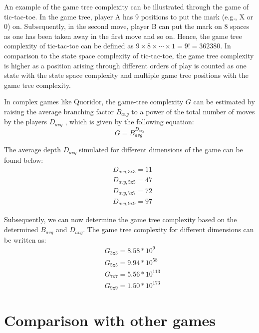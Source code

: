An example of the game tree complexity can be illustrated through the game of tic-tac-toe. In the game tree, player A has 9 positions to put the mark (e.g., X or 0) on. Subsequently, in the second move, player B can put the mark on 8 spaces as one has been taken away in the first move and so on. Hence, the game tree complexity of tic-tac-toe can be defined as $9 \times 8 \times \cdots \times 1 = 9! = 362380$. In comparison to the state space complexity of tic-tac-toe, the game tree complexity is higher as a position arising through different orders of play is counted as one state with the state space complexity and multiple game tree positions with the game tree complexity. 


In complex games like Quoridor, the game-tree complexity $G$ can be estimated by raising the average branching factor $B_{avg}$ to a power of the total number of moves by the players $D_{avg}$ \citep{Mertens2006Quoridor}, which is given by the following equation: 
\begin{equation}
    G = B_{avg}^{D_{avg}}
\end{equation}

The average depth $D_{avg}$ simulated for different dimensions of the game can be found below:
\begin{align*}
    &D_{avg, \text{3x3}} = 11\\
    &D_{avg, \text{5x5}} = 47\\
    &D_{avg, \text{7x7}} = 72\\
    &D_{avg, \text{9x9}} = 97
\end{align*}

Subsequently, we can now determine the game tree complexity based on the determined $B_{avg}$ and $D_{avg}$. The game tree complexity for different dimensions can be written as:
\begin{align*}
    &G_\text{3x3} = 8.58 * 10^9\\
    &G_\text{5x5} = 9.94 * 10^{58}\\
    &G_\text{7x7} = 5.56 * 10^{113}\\
    &G_\text{9x9} = 1.50 * 10^{173}
\end{align*}




\section{Comparison with other games}

